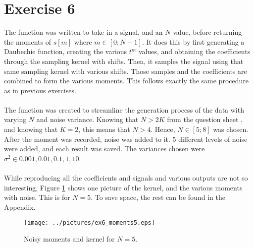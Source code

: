 \documentclass[11pt,a4paper]{report}
\newcommand{\mychapter}[2]
{
    \setcounter{chapter}{#1}
    \setcounter{section}{0}
    \chapter*{#2}
    \addcontentsline{toc}{chapter}{#2}
}
\begin{document}
\mychapter{6}{Exercise 6}
The function  was written to take in a signal, and an $N$ value, before returning the moments of $s[m]$ where $m\in[0;N-1]$. It does this by first generating a Daubechie function, creating the various $t^m$ values, and obtaining the coefficients through the sampling kernel with shifts. Then, it samples the signal using that same sampling kernel with various shifts. Those samples and the coefficients are combined to form the various moments. This follows exactly the same procedure as in previous exercises.
\\\\
The function was created to streamline the generation process of the data with varying $N$ and noise variance. Knowing that $N > 2K$ from the question sheet \cite{question}, and knowing that $K =2$, this means that $N > 4$. Hence, $N \in [5;8]$ was chosen. After the moment was recorded, noise was added to it. 5 different levels of noise were added, and each result was saved. The variances chosen were $\sigma^2 \in {0.001, 0.01, 0.1, 1, 10}$.
\\\\
While reproducing all the coefficients and signals and various outputs are not so interesting, Figure \ref{fig:ex6} shows one picture of the kernel, and the various moments with noise. This is for $N = 5$. To save space, the rest can be found in the Appendix.

\begin{figure}[!ht]
    \centering
    \texttt{[image: ../pictures/ex6\_moments5.eps]}
    \caption{Noisy moments and kernel for $N = 5$.}
    \label{fig:ex6}
\end{figure}
\end{document}
